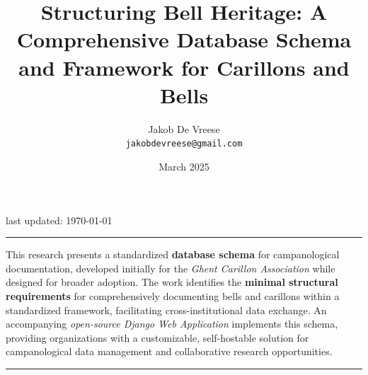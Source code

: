 \documentclass[11pt, a4paper]{article}
\title{\Huge Structuring Bell Heritage: A Comprehensive Database Schema and Framework for Carillons and Bells}
\author{\LARGE{Jakob De Vreese} \\ \texttt{\small{jakobdevreese@gmail.com}}}
\date{March 2025}
\newlength{\abstractwidth}
\begin{document}
\begin{titlepage}
    \maketitle
    \thispagestyle{empty}
    \vspace{1cm}
    \begin{center}
        \small{last updated: \today}
    \end{center}
    \vspace{2cm}
    
    \begin{center}
        \rule{\textwidth}{0.4pt}
        \vspace{1em}
        
        \begin{minipage}{\abstractwidth}
            \setlength{\rightskip}{0pt plus 1fil} %
            \justifying
            \noindent
            This research presents a standardized \textbf{database schema} for campanological documentation, developed initially for the \textit{Ghent Carillon Association} while designed for broader adoption. The work identifies the \textbf{minimal structural requirements} for comprehensively documenting bells and carillons within a standardized framework, facilitating cross-institutional data exchange. An accompanying \textit{open-source Django Web Application} implements this schema, providing organizations with a customizable, self-hostable solution for campanological data management and collaborative research opportunities.
          \end{minipage}
        
        \vspace{1em}
        \rule{\textwidth}{0.4pt}
    \end{center}

    \restoregeometry
\end{titlepage}


\clearpage
\setcounter{page}{1}
\tableofcontents
\clearpage

\end{document}
